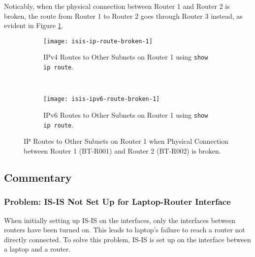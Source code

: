Noticably, when the physical connection between Router 1 and Router 2 is broken, the route from Router 1 to Router 2 goes through Router 3 instead, as evident in Figure \ref{fig:isis-ip-route-broken}.

\begin{figure}[ht!]
    \centering    
    \begin{subfigure}[b]{\textwidth}
        \centering
        \texttt{[image: isis-ip-route-broken-1]}
        \caption{IPv4 Routes to Other Subnets on Router 1 using \texttt{show ip route}.}
    \end{subfigure}
    ~
    \begin{subfigure}[b]{\textwidth}
        \centering
        \texttt{[image: isis-ipv6-route-broken-1]}
        \caption{IPv6 Routes to Other Subnets on Router 1 using \texttt{show ip route}.}
    \end{subfigure}
    \caption{IP Routes to Other Subnets on Router 1 when Physical Connection between Router 1 (BT-R001) and Router 2 (BT-R002) is broken.}
    \label{fig:isis-ip-route-broken}
\end{figure}

\subsection{Commentary}

\subsubsection{Problem: IS-IS Not Set Up for Laptop-Router Interface}
When initially setting up IS-IS on the interfaces, only the interfaces between routers have been turned on. This leads to laptop's failure to reach a router not directly connected.
To solve this problem, IS-IS is set up on the interface between a laptop and a router.

\clearpage



